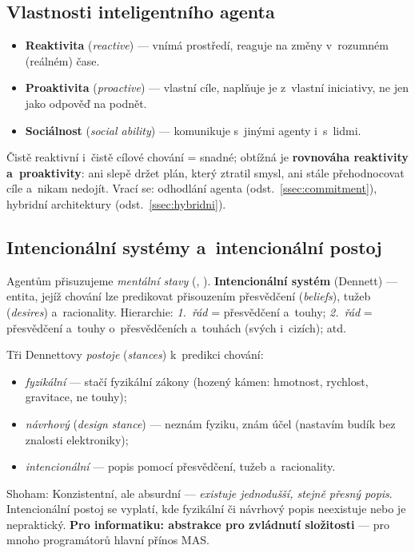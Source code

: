 \documentclass[11pt,a4paper]{article}
\theoremstyle{definition}
\begin{document}
\subsection{Vlastnosti inteligentního agenta}

\begin{itemize}
\item \textbf{Reaktivita} (\emph{reactive}) --- vnímá prostředí, reaguje na změny v~rozumném
  (reálném) čase.
\item \textbf{Proaktivita} (\emph{proactive}) --- vlastní cíle, naplňuje je z~vlastní
  iniciativy, ne jen jako odpověď na podnět.
\item \textbf{Sociálnost} (\emph{social ability}) --- komunikuje s~jinými agenty i~s~lidmi.
\end{itemize}

Čistě reaktivní i~čistě cílové chování = snadné; obtížná je \textbf{rovnováha reaktivity
a~proaktivity}: ani slepě držet plán, který ztratil smysl, ani stále přehodnocovat cíle
a~nikam nedojít. Vrací se: odhodlání agenta (odst.~\ref{ssec:commitment}), hybridní
architektury (odst.~\ref{ssec:hybridni}).

\subsection{Intencionální systémy a~intencionální postoj}

Agentům přisuzujeme \emph{mentální stavy} (, ).
\textbf{Intencionální systém} (Dennett) --- entita, jejíž chování lze predikovat přisouzením
přesvědčení (\emph{beliefs}), tužeb (\emph{desires}) a~racionality. Hierarchie: \emph{1.~řád}
= přesvědčení a~touhy; \emph{2.~řád} = přesvědčení a~touhy o~přesvědčeních a~touhách (svých
i~cizích); atd.

Tři Dennettovy \emph{postoje} (\emph{stances}) k~predikci chování:
\begin{itemize}
\item \emph{fyzikální} --- stačí fyzikální zákony (hozený kámen: hmotnost, rychlost,
  gravitace, ne touhy);
\item \emph{návrhový} (\emph{design stance}) --- neznám fyziku, znám účel (nastavím budík
  bez znalosti elektroniky);
\item \emph{intencionální} --- popis pomocí přesvědčení, tužeb a~racionality.
\end{itemize}

Shoham:  Konzistentní, ale absurdní --- \emph{existuje jednodušší, stejně přesný popis}.
Intencionální postoj se vyplatí, kde fyzikální či návrhový popis neexistuje nebo je
nepraktický. \textbf{Pro informatiku: abstrakce pro zvládnutí složitosti} --- pro mnoho
programátorů hlavní přínos MAS.
\end{document}
